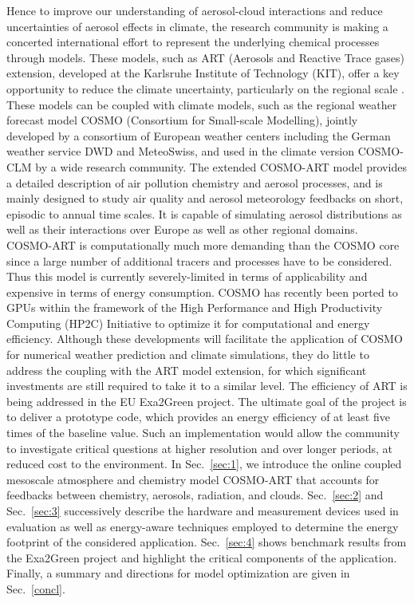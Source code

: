 \noindent 
Hence to  improve our understanding of  aerosol-cloud interactions and
reduce  uncertainties  of aerosol  effects  in  climate, the  research
community is making a  concerted international effort to represent the
underlying chemical  processes through models.  These  models, such as
ART (Aerosols  and Reactive Trace  gases) extension, developed  at the
Karlsruhe Institute  of Technology (KIT),  offer a key  opportunity to
reduce   the  climate  uncertainty,   particularly  on   the  regional
scale \citep{Knote-2011, Bangert-2011,  Knote-2013}.  These models can
be coupled with climate models,  such as the regional weather forecast
model COSMO (Consortium  for Small-scale Modelling), jointly developed
by  a consortium  of  European weather  centers  including the  German
weather service  DWD and MeteoSwiss,  and used in the  climate version
COSMO-CLM by a wide  research community.  The extended COSMO-ART model
provides a detailed description of air pollution chemistry and aerosol
processes, and  is mainly  designed to study  air quality  and aerosol
meteorology feedbacks on short, episodic to annual time scales.  It is
capable  of   simulating  aerosol  distributions  as   well  as  their
interactions over Europe as well as other regional domains.\\

\noindent 
COSMO-ART is  computationally much more demanding than  the COSMO core
since a  large number of additional  tracers and processes  have to be
considered.  Thus this model is currently severely-limited in terms of
applicability and expensive in terms of energy consumption.  COSMO has
recently  been  ported  to  GPUs  within the  framework  of  the  High
Performance  and  High  Productivity  Computing (HP2C)  Initiative  to
optimize it  for computational and energy  efficiency.  Although these
developments will  facilitate the  application of COSMO  for numerical
weather prediction and climate  simulations, they do little to address
the  coupling with  the  ART model  extension,  for which  significant
investments  are still required  to take  it to  a similar  level. The
efficiency of ART is being  addressed in the EU Exa2Green project. The
ultimate goal  of the  project is to  deliver a prototype  code, which
provides an energy  efficiency of at least five  times of the baseline
value.   Such   an  implementation   would  allow  the   community  to
investigate critical  questions at  higher resolution and  over longer
periods, at reduced cost  to the environment.  In Sec.~\ref{sec:1}, we
introduce the online coupled  mesoscale atmosphere and chemistry model
COSMO-ART  \citep{Vogel-2009}  that  accounts  for  feedbacks  between
chemistry,  aerosols,  radiation,  and clouds.   Sec.~\ref{sec:2}  and
Sec.~\ref{sec:3}  successively describe  the hardware  and measurement
devices used in evaluation as well as energy-aware techniques employed
to  determine  the energy  footprint  of  the considered  application.
Sec.~\ref{sec:4}  shows benchmark results  from the  Exa2Green project
and highlight the critical  components of the application.  Finally, a
summary   and  directions   for  model   optimization  are   given  in
Sec.~\ref{concl}.


